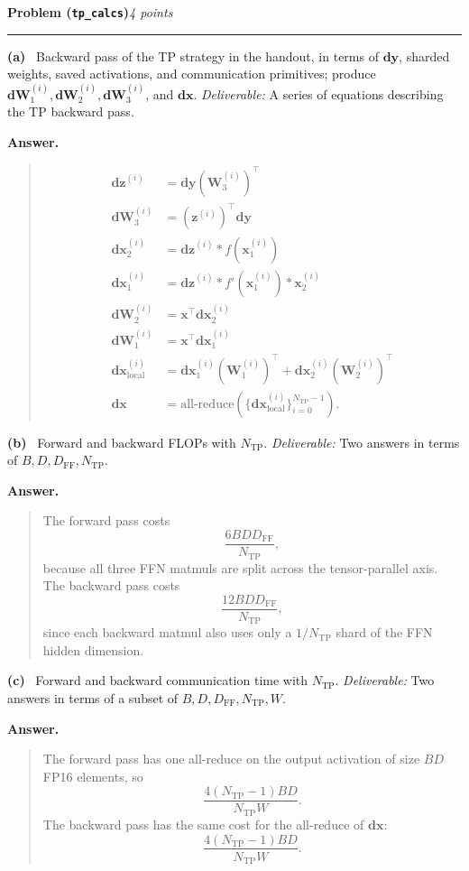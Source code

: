 \documentclass[11pt]{article}
\newcommand{\problem}[2]{%
  \vspace{0.6em}%
  \noindent\textbf{Problem (\texttt{#1})}\hfill\textit{#2 points}\par%
  \vspace{0.2em}\hrule\vspace{0.4em}%
}
\newcommand{\subq}[1]{\vspace{0.3em}\noindent\textbf{(#1)}\ }
\newcommand{\deliverable}[1]{\vspace{0.2em}\noindent\textit{Deliverable:} #1\par}
\newenvironment{answer}{%
  \vspace{0.3em}%
  \noindent\textbf{Answer.}\begin{quote}%
}{%
  \end{quote}\vspace{0.4em}%
}
\begin{document}
\problem{tp\_calcs}{4}

\subq{a} Backward pass of the TP strategy in the handout, in terms of $\mathbf{dy}$, sharded weights, saved activations, and communication primitives; produce $\mathbf{dW}_1^{(i)}, \mathbf{dW}_2^{(i)}, \mathbf{dW}_3^{(i)}$, and $\mathbf{dx}$.
\deliverable{A series of equations describing the TP backward pass.}
\begin{answer}
\begin{align*}
  \mathbf{dz}^{(i)} &= \mathbf{dy} \left(\mathbf{W}_3^{(i)}\right)^\top \\
  \mathbf{dW}_3^{(i)} &= \left(\mathbf{z}^{(i)}\right)^\top \mathbf{dy} \\
  \mathbf{dx}_2^{(i)} &= \mathbf{dz}^{(i)} * f(\mathbf{x}_1^{(i)}) \\
  \mathbf{dx}_1^{(i)} &= \mathbf{dz}^{(i)} * f'(\mathbf{x}_1^{(i)}) * \mathbf{x}_2^{(i)} \\
  \mathbf{dW}_2^{(i)} &= \mathbf{x}^\top \mathbf{dx}_2^{(i)} \\
  \mathbf{dW}_1^{(i)} &= \mathbf{x}^\top \mathbf{dx}_1^{(i)} \\
  \mathbf{dx}^{(i)}_{\mathrm{local}} &=
    \mathbf{dx}_1^{(i)} \left(\mathbf{W}_1^{(i)}\right)^\top
    +
    \mathbf{dx}_2^{(i)} \left(\mathbf{W}_2^{(i)}\right)^\top \\
  \mathbf{dx} &= \mathrm{all\text{-}reduce}\left(\{\mathbf{dx}^{(i)}_{\mathrm{local}}\}_{i=0}^{N_{\mathrm{TP}}-1}\right).
\end{align*}
\end{answer}

\subq{b} Forward and backward FLOPs with $N_{\mathrm{TP}}$.
\deliverable{Two answers in terms of $B, D, D_{\mathrm{FF}}, N_{\mathrm{TP}}$.}
\begin{answer}
  The forward pass costs
  \[
    \frac{6 B D D_{\mathrm{FF}}}{N_{\mathrm{TP}}},
  \]
  because all three FFN matmuls are split across the tensor-parallel axis. The backward pass costs
  \[
    \frac{12 B D D_{\mathrm{FF}}}{N_{\mathrm{TP}}},
  \]
  since each backward matmul also uses only a \(1/N_{\mathrm{TP}}\) shard of the FFN hidden dimension.
\end{answer}

\subq{c} Forward and backward communication time with $N_{\mathrm{TP}}$.
\deliverable{Two answers in terms of a subset of $B, D, D_{\mathrm{FF}}, N_{\mathrm{TP}}, W$.}
\begin{answer}
  The forward pass has one all-reduce on the output activation of size \(BD\) FP16 elements, so
  \[
    \frac{4 (N_{\mathrm{TP}}-1) B D}{N_{\mathrm{TP}} W}.
  \]
  The backward pass has the same cost for the all-reduce of \(\mathbf{dx}\):
  \[
    \frac{4 (N_{\mathrm{TP}}-1) B D}{N_{\mathrm{TP}} W}.
  \]
\end{answer}
\end{document}
